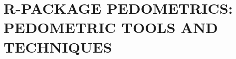 \artigofalse
\chapter{R-PACKAGE PEDOMETRICS: PEDOMETRIC TOOLS AND TECHNIQUES}
\label{appen:pedometrics}


